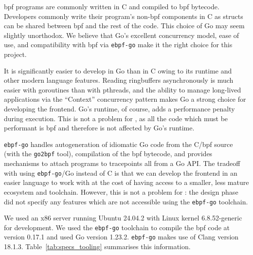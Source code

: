 \ac{bpf} programs are commonly written in C and compiled to \ac{bpf} bytecode.
Developers commonly write their program's non-\ac{bpf} components 
in C as structs can be shared between \ac{bpf} and the rest of the code.
This choice of Go may seem slightly unorthodox. We believe that Go's
excellent concurrency model, ease of use, and compatibility with \ac{bpf} via
\texttt{ebpf-go} make it the right choice for this project. 

It is significantly easier to develop in Go than in C owing to its runtime and other 
modern language features. Reading ringbuffers asynchronously is much easier with 
goroutines than with pthreads, and the ability to manage long-lived applications 
via the  ``Context'' concurrency pattern makes Go a strong choice for developing the 
frontend. Go's runtime, of course, adds a performance penalty during execution. This  is not a problem for \afss, as all the code which must be performant is \ac{bpf} 
and therefore is not affected by Go's runtime. 

\texttt{ebpf-go} handles autogeneration of idiomatic Go code from the C/\ac{bpf}
source (with the \texttt{go2bpf} tool),
compilation of the \ac{bpf} bytecode, and provides mechanisms to attach programs
to tracepoints all from a Go API. The tradeoff with using
\texttt{ebpf-go}/Go instead of C is that we can develop the frontend in an
easier language to work with at the cost of having access to a smaller, less
mature ecosystem and toolchain. However, this is not a problem for \afss: the
design phase did not specify any features which are not accessible using the
\texttt{ebpf-go} toolchain. 

We used an x86 server running Ubuntu 24.04.2 with Linux
kernel 6.8.52-generic for development. We used the \texttt{ebpf-go} toolchain to compile the
\ac{bpf} code at version 0.17.1 and used Go version 1.23.2. \texttt{ebpf-go} makes use of
Clang version 18.1.3.
Table~\ref{tab:specs_tooling} summarises this information.

